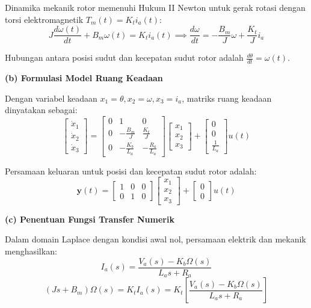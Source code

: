 \documentclass[11pt,a4paper]{article}
\begin{document}
Dinamika mekanik rotor memenuhi Hukum II Newton untuk gerak rotasi dengan torsi elektromagnetik $T_m(t) = K_t i_a(t)$:
$$J \frac{d\omega(t)}{dt} + B_m \omega(t) = K_t i_a(t) \implies \frac{d\omega}{dt} = -\frac{B_m}{J} \omega + \frac{K_t}{J} i_a$$

Hubungan antara posisi sudut dan kecepatan sudut rotor adalah $\frac{d\theta}{dt} = \omega(t)$.

\textbf{(b) Formulasi Model Ruang Keadaan}

Dengan variabel keadaan $x_1 = \theta, x_2 = \omega, x_3 = i_a$, matriks ruang keadaan dinyatakan sebagai:
$$\begin{bmatrix} \dot{x}_1 \\ \dot{x}_2 \\ \dot{x}_3 \end{bmatrix} = \begin{bmatrix} 0 & 1 & 0 \\ 0 & -\frac{B_m}{J} & \frac{K_t}{J} \\ 0 & -\frac{K_b}{L_a} & -\frac{R_a}{L_a} \end{bmatrix} \begin{bmatrix} x_1 \\ x_2 \\ x_3 \end{bmatrix} + \begin{bmatrix} 0 \\ 0 \\ \frac{1}{L_a} \end{bmatrix} u(t)$$

Persamaan keluaran untuk posisi dan kecepatan sudut rotor adalah:
$$\mathbf{y}(t) = \begin{bmatrix} 1 & 0 & 0 \\ 0 & 1 & 0 \end{bmatrix} \begin{bmatrix} x_1 \\ x_2 \\ x_3 \end{bmatrix} + \begin{bmatrix} 0 \\ 0 \end{bmatrix} u(t)$$

\textbf{(c) Penentuan Fungsi Transfer Numerik}

Dalam domain Laplace dengan kondisi awal nol, persamaan elektrik dan mekanik menghasilkan:
$$I_a(s) = \frac{V_a(s) - K_b \Omega(s)}{L_a s + R_a}$$
$$(J s + B_m) \Omega(s) = K_t I_a(s) = K_t \left[ \frac{V_a(s) - K_b \Omega(s)}{L_a s + R_a} \right]$$
\end{document}
